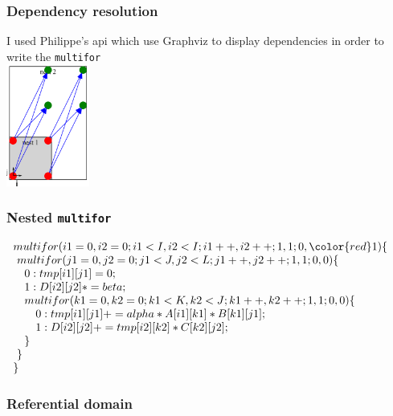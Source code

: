 \documentclass{beamer}
\begin{document}

\begin{frame}
\frametitle{Dependency resolution}

I used Philippe's api which use Graphviz to display dependencies in order to write the \texttt{multifor} \\
\centering
\includegraphics[height=4cm]{pictures/2mm}

\end{frame}


\begin{frame}
\frametitle{Nested \texttt{multifor}}

{\footnotesize$\begin{array}{l}
multifor(i1=0, i2=0; i1< I, i2< I; i1++, i2++; 1, 1; 0, {\color{red}1})\{ \\
~multifor(j1=0, j2=0; j1< J, j2< L; j1++, j2++; 1, 1; 0, 0)\{ \\
\quad{}0: tmp[i1][j1]=0; \\
\quad{}1: D[i2][j2]*=beta; \\
\quad{}multifor(k1=0, k2=0; k1< K, k2< J; k1++, k2++; 1, 1; 0, 0)\{ \\
\qquad{}0: tmp[i1][j1]+=alpha* A[i1][k1]* B[k1][j1]; \\
\qquad{}1: D[i2][j2]+= tmp[i2][k2] * C[k2][j2]; \\
\quad{}\} \\
~\} \\
\}
\end{array}$
}

\end{frame}


\begin{frame}
\frametitle{Referential domain}


\end{frame}
\end{document}
